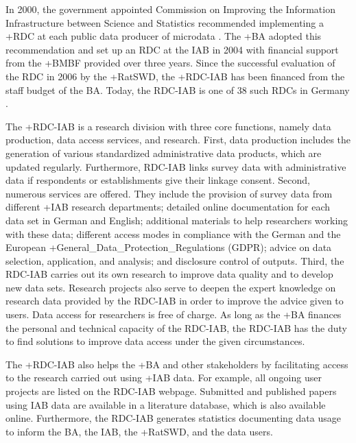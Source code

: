 \documentclass[
]{book}
\begin{document}
In 2000, the government appointed Commission on Improving the Information Infrastructure between Science and Statistics recommended implementing a +RDC\textbar{} at each public data producer of microdata \citep{kvikommissionzurverbesserungderinformationelleninfrastrukturzwischenwissenschaftundstatistik2001}. The +BA\textbar{} adopted this recommendation and set up an RDC at the IAB in 2004 with financial support from the +BMBF\textbar{} provided over three years. Since the successful evaluation of the RDC in 2006 by the +RatSWD\textbar, the +RDC-IAB\textbar{} has been financed from the staff budget of the BA. Today, the RDC-IAB is one of 38 such RDCs in Germany \citep{germandataforum}.

The +RDC-IAB\textbar{} is a research division with three core functions, namely data production, data access services, and research. First, data production includes the generation of various standardized administrative data products, which are updated regularly. Furthermore, RDC-IAB links survey data with administrative data if respondents or establishments give their linkage consent. Second, numerous services are offered. They include the provision of survey data from different +IAB\textbar{} research departments; detailed online documentation for each data set in German and English; additional materials to help researchers working with these data; different access modes in compliance with the German and the European +General\_Data\_Protection\_Regulations\textbar{} (GDPR); advice on data selection, application, and analysis; and disclosure control of outputs. Third, the RDC-IAB carries out its own research to improve data quality and to develop new data sets. Research projects also serve to deepen the expert knowledge on research data provided by the RDC-IAB in order to improve the advice given to users. Data access for researchers is free of charge. As long as the +BA\textbar{} finances the personal and technical capacity of the RDC-IAB, the RDC-IAB has the duty to find solutions to improve data access under the given circumstances.

The +RDC-IAB\textbar{} also helps the +BA\textbar{} and other stakeholders by facilitating access to the research carried out using +IAB\textbar{} data. For example, all ongoing user projects are listed on the RDC-IAB webpage. Submitted and published papers using IAB data are available in a literature database, which is also available online. Furthermore, the RDC-IAB generates statistics documenting data usage to inform the BA, the IAB, the +RatSWD\textbar, and the data users.
\end{document}
